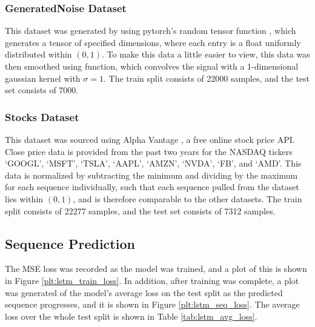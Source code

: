 \documentclass{scrartcl}
\begin{document}
\subsubsection{GeneratedNoise Dataset}
\label{subsubsec:generatednoise_intro}

This dataset was generated by using pytorch's random tensor function
, which generates a tensor of specified dimensions,
where each entry is a float uniformly distributed within $(0, 1)$. To make this
data a little easier to view, this data was then smoothed using
 function, which convolves
the signal with a 1-dimensional gaussian kernel with $\sigma = 1$. The train
split consists of 22000 samples, and the test set consists of 7000.

\subsubsection{Stocks Dataset}
\label{subsubsec:stocks_intro}

This dataset was sourced using Alpha Vantage \cite{alpha_vantage}, a free
online stock price API. Close price data is provided from the past two years
for the NASDAQ tickers `GOOGL', `MSFT', `TSLA', `AAPL', `AMZN', `NVDA', `FB',
and `AMD'. This data is normalized by subtracting the minimum and dividing by
the maximum for each sequence individually, such that each sequence pulled from
the dataset lies within $(0, 1)$, and is therefore comparable to the other
datasets. The train split consists of 22277 samples, and the test set consists
of 7312 samples.

\subsection{Sequence Prediction}
\label{subsec:experiment_sp}

The MSE loss was recorded as the model was trained, and a plot of this is shown
in Figure \ref{plt:lstm_train_loss}. In addition, after training was complete,
a plot was generated of the model's average loss on the test split as the
predicted sequence progresses, and it is shown in Figure
\ref{plt:lstm_seq_loss}. The average loss over the whole test split is shown in
Table \ref{tab:lstm_avg_loss}.
\end{document}
